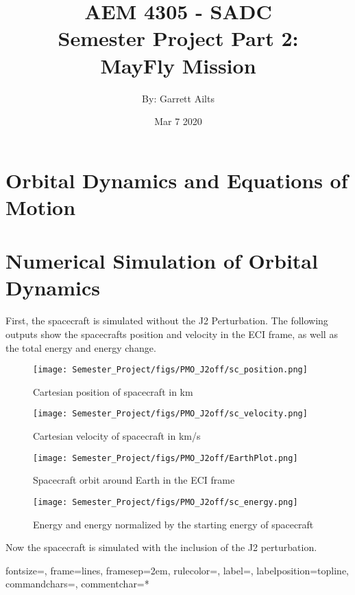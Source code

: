 \documentclass[12pt]{article}
\title{AEM 4305 - SADC \\ Semester Project Part 2: \\ MayFly Mission }
\author{By: Garrett Ailts \\ }
\date{Mar 7 2020}
\begin{document}
\maketitle
\thispagestyle{empty}
\newpage

\section{Orbital Dynamics and Equations of Motion}



\newpage

\section{Numerical Simulation of Orbital Dynamics}
First, the spacecraft is simulated without the J2 Perturbation. The following outputs show the spacecrafts position and velocity in the ECI frame, as well as the total energy and energy change.

\begin{figure}[H]
\centering
    \texttt{[image: Semester\_Project/figs/PMO\_J2off/sc\_position.png]}
    \caption{Cartesian position of spacecraft in km}
\end{figure}
\begin{figure}[H]
\centering
    \texttt{[image: Semester\_Project/figs/PMO\_J2off/sc\_velocity.png]}
    \caption{Cartesian velocity of spacecraft in km/s}
\end{figure}
\begin{figure}[H]
\centering
    \texttt{[image: Semester\_Project/figs/PMO\_J2off/EarthPlot.png]}
    \caption{Spacecraft orbit around Earth in the ECI frame}
\end{figure}
\begin{figure}[H]
\centering
    \texttt{[image: Semester\_Project/figs/PMO\_J2off/sc\_energy.png]}
    \caption{Energy and energy normalized by the starting energy of spacecraft}
\end{figure}

\newpage
Now the spacecraft is simulated with the inclusion of the J2 perturbation.

{}%
{fontsize=\footnotesize,
 frame=lines,  %
 framesep=2em, %
 rulecolor=\color{Gray},
 label=,
 labelposition=topline,
 commandchars=\|\(\), %
 commentchar=*        %
}
\end{document}
